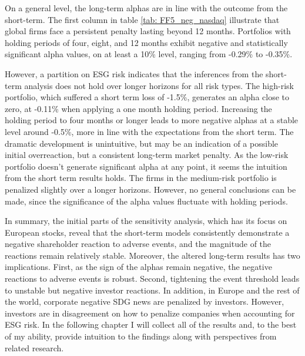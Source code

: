 On a general level, the long-term alphas are in line with the outcome from the short-term. The first column in table \ref{tab: FF5_neg_nasdaq} illustrate that global firms face a persistent penalty lasting beyond 12 months. Portfolios with holding periods of four, eight, and 12 months exhibit negative and statistically significant alpha values, on at least a 10\% level,  ranging from -0.29\% to -0.35\%. 

However, a partition on ESG risk indicates that the inferences from the short-term analysis does not hold over longer horizons for all risk types. The high-risk portfolio, which suffered a short term loss of -1.5\%, generates an alpha close to zero, at -0.11\% when applying a one month holding period. Increasing the holding period to four months or longer leads to more negative alphas at a stable level around -0.5\%, more in line with the expectations from the short term. The dramatic development is unintuitive, but may be an indication of a possible initial overreaction, but a consistent long-term market penalty. As the low-risk portfolio doesn't generate significant alpha at any point, it seems the intuition from the short term results holds. The firms in the medium-risk portfolio is penalized slightly over a longer horizons. However, no general conclusions can be made, since the significance of the alpha values fluctuate with holding periods. 

In summary, the initial parts of the sensitivity analysis, which has its focus on European stocks, reveal that the short-term models consistently demonstrate a negative shareholder reaction to adverse events, and the magnitude of the reactions remain relatively stable. Moreover, the altered long-term results has two implications. First, as the sign of the alphas remain negative, the negative reactions to adverse events is robust. Second, tightening the event threshold leads to unstable but negative investor reactions. In addition, in Europe and the rest of the world, corporate negative SDG news are penalized by investors. However, investors are in disagreement on how to penalize companies when accounting for ESG risk. In the following chapter I will collect all of the results and, to the best of my ability, provide intuition to the findings along with perspectives from related research. 